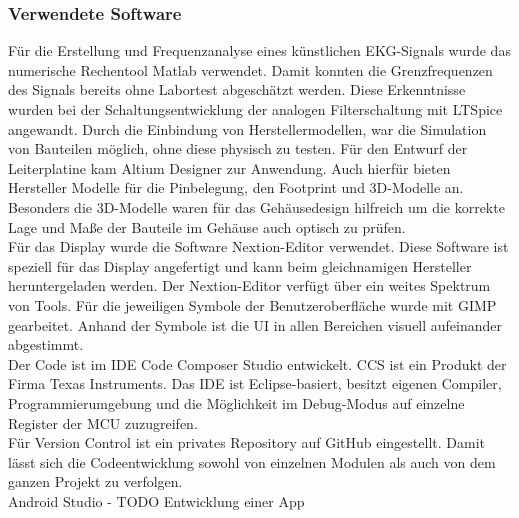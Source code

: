 
\subsubsection{Verwendete Software}
Für die Erstellung und Frequenzanalyse eines künstlichen EKG-Signals wurde das numerische Rechentool Matlab verwendet. Damit konnten die Grenzfrequenzen des Signals bereits ohne Labortest abgeschätzt werden. Diese Erkenntnisse wurden bei der Schaltungsentwicklung der analogen Filterschaltung mit LTSpice angewandt. Durch die Einbindung von Herstellermodellen, war die Simulation von Bauteilen möglich, ohne diese physisch zu testen. Für den Entwurf der Leiterplatine kam Altium Designer zur Anwendung. Auch hierfür bieten Hersteller Modelle für die Pinbelegung, den Footprint und 3D-Modelle an. Besonders die 3D-Modelle waren für das Gehäusedesign hilfreich um die korrekte Lage und Maße der Bauteile im Gehäuse auch optisch zu prüfen.\\
Für das Display wurde die Software Nextion-Editor verwendet. Diese Software ist speziell für das Display angefertigt und kann beim gleichnamigen Hersteller heruntergeladen werden. Der Nextion-Editor verfügt über ein weites Spektrum von Tools. Für die jeweiligen Symbole der Benutzeroberfläche wurde mit GIMP gearbeitet. Anhand der Symbole ist die UI in allen Bereichen visuell aufeinander abgestimmt.\\
Der Code ist im IDE Code Composer Studio entwickelt. CCS ist ein Produkt der Firma Texas Instruments. Das IDE ist Eclipse-basiert, besitzt eigenen Compiler, Programmierumgebung und die Möglichkeit im Debug-Modus auf einzelne Register der MCU zuzugreifen.\\
Für Version Control ist ein privates Repository auf GitHub eingestellt. Damit lässt sich die Codeentwicklung sowohl von einzelnen Modulen als auch von dem ganzen Projekt zu verfolgen.\\
Android Studio - TODO Entwicklung einer App\\

